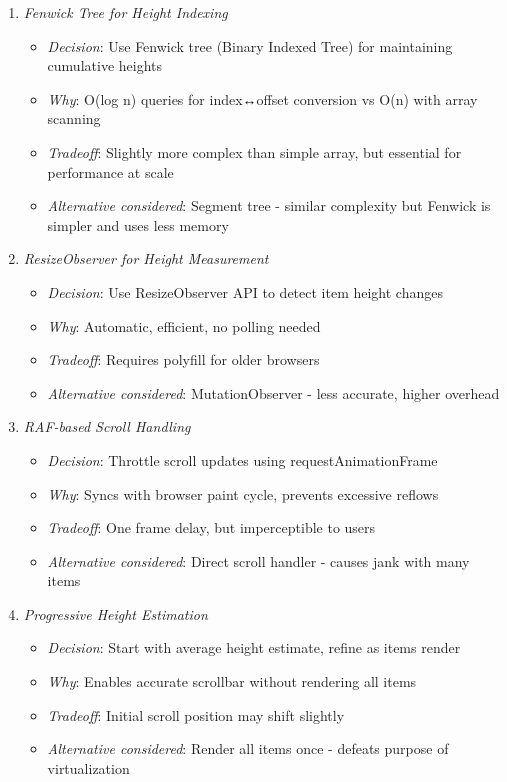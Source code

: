 \documentclass[11pt]{article}
\begin{document}
\begin{enumerate}
\item \emph{Fenwick Tree for Height Indexing}

\begin{itemize}
\item \emph{Decision}: Use Fenwick tree (Binary Indexed Tree) for maintaining cumulative heights
\item \emph{Why}: O(log n) queries for index↔offset conversion vs O(n) with array scanning
\item \emph{Tradeoff}: Slightly more complex than simple array, but essential for performance at scale
\item \emph{Alternative considered}: Segment tree - similar complexity but Fenwick is simpler and uses less memory
\end{itemize}

\item \emph{ResizeObserver for Height Measurement}

\begin{itemize}
\item \emph{Decision}: Use ResizeObserver API to detect item height changes
\item \emph{Why}: Automatic, efficient, no polling needed
\item \emph{Tradeoff}: Requires polyfill for older browsers
\item \emph{Alternative considered}: MutationObserver - less accurate, higher overhead
\end{itemize}

\item \emph{RAF-based Scroll Handling}

\begin{itemize}
\item \emph{Decision}: Throttle scroll updates using requestAnimationFrame
\item \emph{Why}: Syncs with browser paint cycle, prevents excessive reflows
\item \emph{Tradeoff}: One frame delay, but imperceptible to users
\item \emph{Alternative considered}: Direct scroll handler - causes jank with many items
\end{itemize}

\item \emph{Progressive Height Estimation}

\begin{itemize}
\item \emph{Decision}: Start with average height estimate, refine as items render
\item \emph{Why}: Enables accurate scrollbar without rendering all items
\item \emph{Tradeoff}: Initial scroll position may shift slightly
\item \emph{Alternative considered}: Render all items once - defeats purpose of virtualization
\end{itemize}
\end{enumerate}
\end{document}
